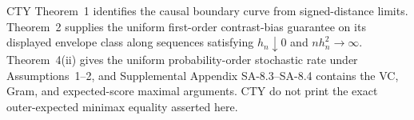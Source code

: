 CTY Theorem~1 identifies the causal boundary curve from signed-distance limits.  Theorem~2 supplies the uniform first-order contrast-bias guarantee on its displayed envelope class along sequences satisfying \(h_n\downarrow0\) and \(nh_n^2\to\infty\).  Theorem~4(ii) gives the uniform probability-order stochastic rate under Assumptions~1--2, and Supplemental Appendix SA-8.3--SA-8.4 contains the VC, Gram, and expected-score maximal arguments.  CTY do not print the exact outer-expected minimax equality asserted here.